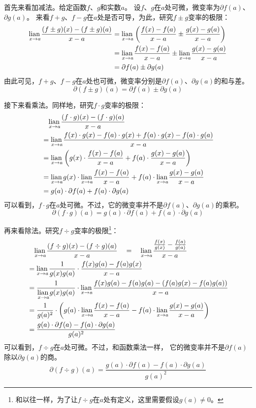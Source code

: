 \documentclass[12pt,UTF8,fontset=none]{ctexbook}
\begin{document}
首先来看加减法。给定函数$f$、$g$和实数$a$。
设$f$、$g$在$a$处可微，微变率为$\partial f(a)$、$\partial g(a)$。
来看$f+g$、$f-g$在$a$处是否可导，为此，研究$f \pm g$变率的极限：
\begin{align*}
    \underset{x\to a}{\operatorname{lian}\,} \frac{(f \pm g)(x) - (f \pm g)(a)}{x - a} &= \underset{x\to a}{\operatorname{lian}\,} \left(\frac{f(x) - f(a)}{x - a} \pm \frac{g(x) - g(a)}{x - a}\right)  \\
    &= \underset{x\to a}{\operatorname{lian}\,} \frac{f(x) - f(a)}{x - a} \pm \underset{x\to a}{\operatorname{lian}\,} \frac{g(x) - g(a)}{x - a}  \\
    &= \partial f(a) \pm \partial g(a) 
\end{align*}
由此可见，$f+g$、$f-g$在$a$处也可微，微变率分别是$\partial f(a)$、$\partial g(a)$的和与差。
$$ \partial (f \pm g)(a) = \partial f(a) \pm \partial g(a) $$

接下来看乘法。同样地，研究$f \cdot g$变率的极限：
\begin{align*}
    & \quad \underset{x\to a}{\operatorname{lian}\,} \frac{(f \cdot g)(x) - (f \cdot g)(a)}{x - a}  \\
    &=  \underset{x\to a}{\operatorname{lian}\,} \frac{f(x)\cdot g(x) - f(a)\cdot g(x) + f(a)\cdot g(x) - f(a)\cdot g(a)}{x - a}  \\
    &= \underset{x\to a}{\operatorname{lian}\,} \left(g(x)\cdot\frac{f(x) - f(a)}{x - a} + f(a)\cdot\frac{g(x) - g(a)}{x - a}\right)  \\
    &= \underset{x\to a}{\operatorname{lian}\,} g(x) \cdot \underset{x\to a}{\operatorname{lian}\,}\frac{f(x) - f(a)}{x - a} + f(a)\cdot \underset{x\to a}{\operatorname{lian}\,} \frac{g(x) - g(a)}{x - a}  \\
    &= g(a)\cdot\partial f(a) + f(a) \cdot\partial g(a) 
\end{align*}
可以看到，$f \cdot g$在$a$处可微。不过，它的微变率并不是$\partial f(a)$、$\partial g(a)$的乘积。
$$ \partial (f \cdot g)(a) = g(a)\cdot\partial f(a) + f(a) \cdot\partial g(a) $$

再来看除法。研究$f \div g$变率的极限\footnote{和以往一样，为了让$f \div g$在$a$处有定义，这里需要假设$g(a)\neq 0$。}：
\begin{align*}
    & \quad \underset{x\to a}{\operatorname{lian}\,} \frac{(f \div g)(x) - (f \div g)(a)}{x - a} \quad = \quad \underset{x\to a}{\operatorname{lian}\,} \frac{\frac{f(x)}{g(x)} - \frac{f(a)}{g(a)}}{x - a}  \\
    &= \underset{x\to a}{\operatorname{lian}\,} \frac{1}{g(x)g(a)}\cdot\frac{f(x) g(a) - f(a) g(x)}{x - a}  \\
    &= \frac{1}{\underset{x\to a}{\operatorname{lian}\,}g(x)g(a)} \cdot \underset{x\to a}{\operatorname{lian}\,} \frac{f(x) g(a) - f(a) g(a) - (f(a) g(x) - f(a) g(a))}{x - a}  \\
    &= \frac{1}{g(a)^2}\cdot \left( g(a)\cdot \underset{x\to a}{\operatorname{lian}\,} \frac{f(x) - f(a)}{x - a} - f(a) \cdot\underset{x\to a}{\operatorname{lian}\,} \frac{g(x) - g(a)}{x - a}\right)  \\
    &= \frac{g(a)\cdot \partial f(a) - f(a)\cdot \partial g(a)}{g(a)^2} 
\end{align*}
可以看到，$f \div g$在$a$处可微。不过，和函数乘法一样，
它的微变率并不是$\partial f(a)$除以$\partial g(a)$的商。
$$ \partial (f \div g)(a) = \frac{g(a)\cdot \partial f(a) - f(a)\cdot \partial g(a)}{g(a)^2} $$
\end{document}
